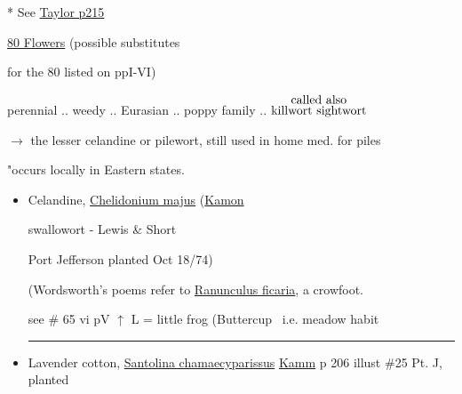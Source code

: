 \documentclass[a4paper,10pt]{article}
\begin{document}
\color{blue}
\begin{flushright}
\par
\end{flushright}
\begin{flushleft}
\color{red} 
\begin{turn}{25}%
* See \ul{Taylor p215} 
\end{turn}
\ul{80 Flowers} (possible substitutes\par
\color{red}for the 80 listed on ppI-VI) \hfill \color{blue} \par

\color{red}
\small
{} perennial .. weedy .. Eurasian .. poppy family .. {$\stackrel{\hbox{called also}}{\hbox{killwort sightwort}}$}\par
 $\rightarrow$ the lesser celandine or pilewort, still used in home med. for piles\par
"occurs locally in Eastern states.\par
\begin{itemize}
\color{blue}
\normalsize
\item Celandine, \ul{Chelidonium majus} (\ul{Kamon}\par
\tiny 
\color{red}
swallowort - Lewis \& Short\par
\color{blue}
\normalsize
\color{red}
 \color{blue}Port Jefferson planted Oct 18/74)\par
\color{red}
\small
{} (Wordsworth's poems refer to \ul{Ranunculus ficaria}, a crowfoot.\par
see \# 65 vi pV 
\color{blue}
$\uparrow$ L = little frog (Buttercup \ i.e. meadow habit
\rule{10cm}{0.01cm}
\normalsize
\item Lavender cotton, \ul{Santolina chamaecyparissus} \ul{Kamm} p 206 illust \#25 Pt. J, planted\par 
\color{red}
\tiny
\newsavebox{\abc}
%
\begin{turn}{25}\usebox{\abc}\end{turn}

\end{itemize}
\end{flushleft}
\end{document}
